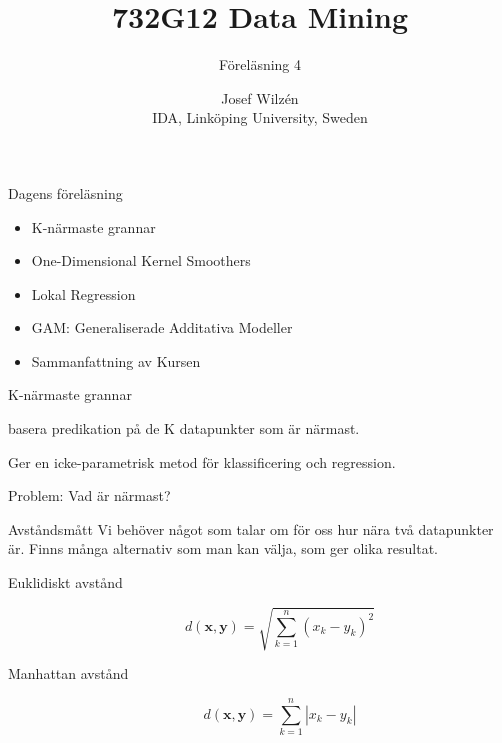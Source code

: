 \documentclass[10pt,english]{beamer}
\title{732G12 Data Mining}
\subtitle{Föreläsning 4}
\date{}
\author{Josef Wilzén \\ IDA, Linköping University, Sweden}
\begin{document}
\maketitle

\begin{frame}{Dagens föreläsning}

    \begin{itemize}
        \item K-närmaste grannar
        \item One-Dimensional Kernel Smoothers
        \item Lokal Regression
        \item GAM: Generaliserade Additativa Modeller
        \item Sammanfattning av Kursen
    \end{itemize}
    
\end{frame}

\begin{frame}{K-närmaste grannar}
    \begin{greenbox}
         basera predikation på de K datapunkter som är närmast.
   \end{greenbox}

   Ger en icke-parametrisk metod för klassificering och regression.

   Problem: Vad är närmast?
\end{frame}

\begin{frame}{Avståndsmått}
    Vi behöver något som talar om för oss hur nära två datapunkter är. Finns många alternativ som man kan välja, som ger olika resultat.

    \begin{description}
        \item[Euklidiskt avstånd]
        \begin{equation*}
            d(\mathbf{x},\mathbf{y}) = \sqrt{\sum_{k=1}^{n} (x_k - y_k)^2}
        \end{equation*}
        \item[Manhattan avstånd] 
        \begin{equation*}
            d(\mathbf{x},\mathbf{y}) = \sum_{k=1}^{n} | x_k - y_k |
        \end{equation*}
    \end{description}
\end{frame}
\end{document}
